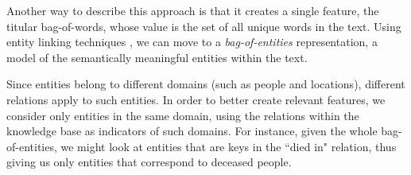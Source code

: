 \documentclass{article}
\theoremstyle{definition}
\begin{document}
Another way to describe this approach is that it creates a single feature, the titular bag-of-words, whose value is the set of all unique words in the text.
Using entity linking techniques \citep{rao2013entity}, we can move to a \emph{bag-of-entities} representation, a model of the semantically meaningful entities within the text.


Since entities belong to different domains (such as people and locations), different relations apply to such entities. In order to better create relevant features, we consider only entities in the same domain, using the relations within the knowledge base as indicators of such domains. For instance, given the whole bag-of-entities, we might look at entities that are keys in the ``died in" relation, thus giving us only entities that correspond to deceased people.

\end{document}
